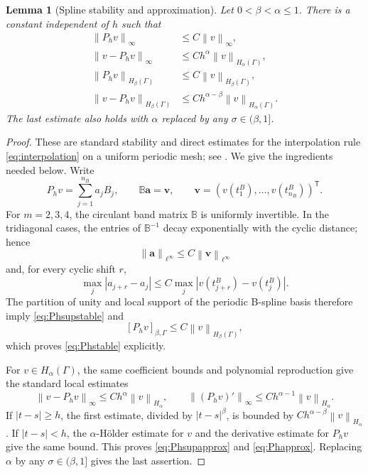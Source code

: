 \documentclass[11pt,a4paper]{amsart}
\theoremstyle{plain}
\newtheorem{lemma}[theorem]{Lemma}
\theoremstyle{definition}
\theoremstyle{remark}
\newcommand{\Ga}{\Gamma}
\newcommand{\norm}[1]{\left\|#1\right\|}
\begin{document}
\begin{lemma}[Spline stability and approximation]\label{lem:splineapprox}
Let $0<\beta<\alpha\le1$.  There is a constant independent of $h$ such that
\begin{align}
        \norm{P_hv}_{\infty}
        &\le C\norm{v}_{\infty},\label{eq:Phsupstable}\\
        \norm{v-P_hv}_{\infty}
        &\le Ch^\alpha\norm{v}_{H_\alpha(\Ga)},\label{eq:Phsupapprox}\\
        \norm{P_hv}_{H_\beta(\Ga)}
        &\le C\norm{v}_{H_\beta(\Ga)},\label{eq:Phstable}\\
        \norm{v-P_hv}_{H_\beta(\Ga)}
        &\le Ch^{\alpha-\beta}\norm{v}_{H_\alpha(\Ga)}.
        \label{eq:Phapprox}
\end{align}
The last estimate also holds with $\alpha$ replaced by any
$\sigma\in(\beta,1]$.
\end{lemma}

\begin{proof}
These are standard stability and direct estimates for the interpolation rule \eqref{eq:interpolation} on a uniform periodic mesh; see \cite{deBoor,Schumaker}.  We give the ingredients needed below.  Write
\[
        P_hv=\sum_{j=1}^{n_B}a_jB_j,
        \qquad
        \mathbb B\bm a=\bm v,
        \qquad
        \bm v=(v(t_1^B),\ldots,v(t_{n_B}^B))^{\mathsf T}.
\]
For $m=2,3,4$, the circulant band matrix $\mathbb B$ is uniformly invertible.  In the tridiagonal cases, the entries of $\mathbb B^{-1}$ decay exponentially with the cyclic distance; hence
\[
        \norm{\bm a}_{\ell^\infty}\le C\norm{\bm v}_{\ell^\infty}
\]
and, for every cyclic shift $r$,
\[
        \max_j|a_{j+r}-a_j|
        \le C\max_j|v(t_{j+r}^B)-v(t_j^B)|.
\]
The partition of unity and local support of the periodic B-spline basis therefore imply \eqref{eq:Phsupstable} and
\[
        [P_hv]_{\beta,\Ga}\le C\norm{v}_{H_\beta(\Ga)},
\]
which proves \eqref{eq:Phstable} explicitly.

For $v\in H_\alpha(\Ga)$, the same coefficient bounds and polynomial reproduction give the standard local estimates
\[
        \norm{v-P_hv}_\infty\le Ch^\alpha\norm{v}_{H_\alpha},
        \qquad
        \norm{(P_hv)' }_\infty\le Ch^{\alpha-1}\norm{v}_{H_\alpha}.
\]
If $|t-s|\ge h$, the first estimate, divided by $|t-s|^\beta$, is bounded by $Ch^{\alpha-\beta}\norm{v}_{H_\alpha}$.  If $|t-s|<h$, the $\alpha$-H\"older estimate for $v$ and the derivative estimate for $P_hv$ give the same bound.  This proves \eqref{eq:Phsupapprox} and \eqref{eq:Phapprox}.  Replacing $\alpha$ by any $\sigma\in(\beta,1]$ gives the last assertion.
\end{proof}
\end{document}
